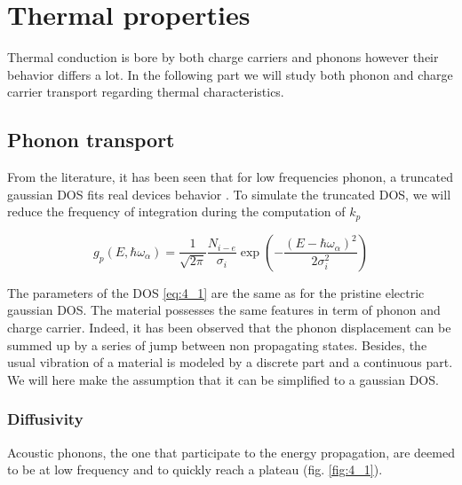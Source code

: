 
\chapter{Thermal properties}

Thermal conduction is bore by both charge carriers and phonons however their behavior differs a lot. In the following part we will study both phonon and charge carrier transport regarding thermal characteristics.

\section{Phonon transport}

From the literature, it has been seen that for low frequencies phonon, a truncated gaussian DOS fits real devices behavior \cite{phonon_DOS}. To simulate the truncated DOS, we will reduce the frequency of integration during the computation of $k_p$

\begin{equation}
    g_p\left(E, \hbar \omega_{\alpha}\right)=\frac{1}{\sqrt{2 \pi}}\frac{N_{i-e}}{\sigma_{i}} \exp \left(-\frac{\left(E-\hbar \omega_{\alpha}\right)^{2}}{2 \sigma_{i}^{2}}\right)
    \label{eq:4_1}
\end{equation}

The parameters of the DOS \ref{eq:4_1} are the same as for the pristine electric gaussian DOS. The material possesses the same features in term of phonon and charge carrier. Indeed, it has been observed \cite{phonon_hopping} that the phonon displacement can be summed up by a series of jump between non propagating states. Besides, the usual vibration of a material is modeled by a discrete part \cite{vibration_phonon} and a continuous part. We will here make the assumption that it can be simplified to a gaussian DOS.

\subsection{Diffusivity}

Acoustic phonons, the one that participate to the energy propagation, are deemed to be at low frequency and to quickly reach a plateau (fig. \ref{fig:4_1}).

